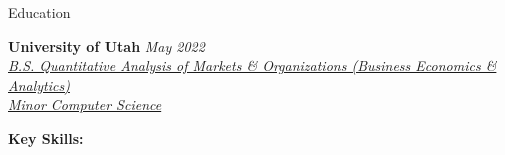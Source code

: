\documentclass{resume/resume}
\begin{document}
\begin{rSection}{Education}

{\bf University of Utah} \hfill {\em May 2022}
\vspace{2pt}
\emph{
    \\ \href{https://eccles.utah.edu/programs/undergraduate/academics/majors/qamo/}{B.S. Quantitative Analysis of Markets \& Organizations (Business Economics \& Analytics)}
    \\ \href{https://github.com/search?o=desc&q=user\%3ASpelkington&s=updated&type=Repositories}{Minor Computer Science}
}

%
%
%
%
%
%
%   
%
%
%
%

%
%
{\bf Key Skills:}
\vspace{-1.83em}


\end{rSection}
\end{document}
